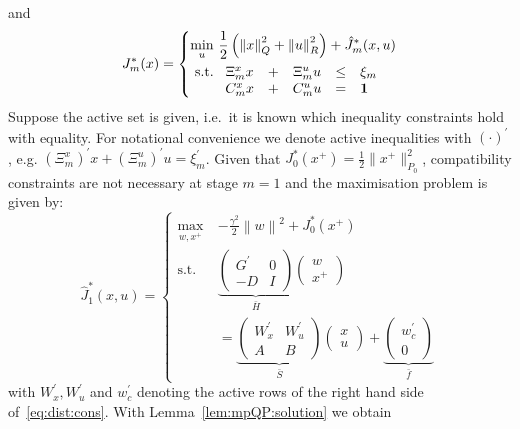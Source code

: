 \documentclass{ifacconf}
\providecommand{\norm}[1]{\left\|#1\right\|}
\begin{document}
and
\[
	J_m^\ast(x) = \left\{\begin{split}
    \min_{u}\ & \frac{1}{2}\left(\norm{x}^2_Q + \norm{u}_R^2\right) + \hat J_m^\ast(x,u)\\
    \text{s.t.}\ & \begin{array}[t]{ccccl}
    \Xi^x_m x &+& \Xi^u_m u &\leq &\xi_m\\
    C_m^x x &+ & C^u_m u & = & {\bf{1}}
    \end{array}
    \end{split}
    \right.
\]
Suppose the active set is given, i.e.~it is known which inequality constraints hold with equality. 
For notational convenience we denote active inequalities with $(\cdot)^\prime$, e.g.  $(\Xi^x_m)^\prime x + (\Xi^u_m)^\prime u = \xi_m^\prime$. 
Given that $J^\ast_0(x^+) = \frac{1}{2}\|x^+\|_{P_0}^2$, compatibility constraints are not necessary at 
stage $m=1$ and the maximisation problem is given by:
\[
	\hat J_1^\ast(x,u) = \left\{\begin{split}
	\max_{w,x^+} \ & {-\frac{\gamma^2}{2}}\norm{w}^2 + J_{0}^\ast(x^+)\\
	\text{s.t. }\ & 
	\underbrace{\left(\begin{array}{cc}
	G^\prime & 0 \\ -D & I
	\end{array}\right)}_{\bar H}
	\left(\begin{array}{c}w\\ x^+\end{array}\right)
	\\&= \underbrace{\left(\begin{array}{cc}W_x^\prime & W_u^\prime \\ A & B\end{array}\right)}_{
	\bar S
	}
	\left(\begin{array}{c}x \\ u \end{array}\right) + \underbrace{\left(\begin{array}{c}
	w_c^\prime \\ 0\end{array}\right)}_{\bar f}
	\end{split}\right.
\]
with $W_x^\prime, W_u^\prime$ and $w_c^\prime$ denoting the active rows of the right hand side 
of~\eqref{eq:dist:cons}.
With Lemma~\ref{lem:mpQP:solution} we obtain
\end{document}
